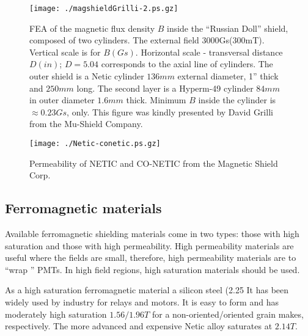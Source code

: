 \documentclass[12pt]{article}
\begin{document}



\begin{figure}[htbp]%
\begin{center}
\texttt{[image: ./magshieldGrilli-2.ps.gz]}
\end{center}
\caption{FEA of the magnetic flux density $B$ inside the ``Russian Doll'' shield,
  composed of two cylinders.  The external field 3000Gs(300mT). 
Vertical scale is for  $B(Gs)$. Horizontal scale - transversal distance $D(in)$;
 $D=5.04$ corresponds to the axial line of  cylinders. 
The outer shield is a Netic cylinder $136mm$  
external diameter, 1'' thick and  $250mm$ long.
The second layer is a Hyperm-49 cylinder $84mm$ in outer  diameter
$1.6mm$ thick.
 Minimum $B$ inside the cylinder is  $\approx0.23Gs$, only.
This figure was 
 kindly presented  by David Grilli from the Mu-Shield Company. 
\label{shieldGrilli}}
\end{figure}
\clearpage




\begin{figure}[htbp]%
\begin{center}
\texttt{[image: ./Netic-conetic.ps.gz]}
\end{center}
\caption{Permeability of NETIC and CO-NETIC from the Magnetic Shield Corp. 
\label{muneco}}
\end{figure}
\clearpage



\subsection{Ferromagnetic materials}
Available ferromagnetic shielding materials come 
in two types: those with high saturation and 
those with high permeability.
High permeability materials are useful where the fields are small, 
therefore,  high permeability materials are to ``wrap '' PMTs. 
In high field regions, high saturation materials 
should be used.  

As a  high saturation ferromagnetic material
 a  silicon steel (2.25%
 It has been  widely used  by  industry for relays and motors. 
It  is easy to form and  has moderately high saturation  $1.56/1.96T$ 
for a  non-oriented/oriented grain makes, respectively.
The more advanced and expensive  Netic alloy saturates at $2.14T$.
\end{document}
